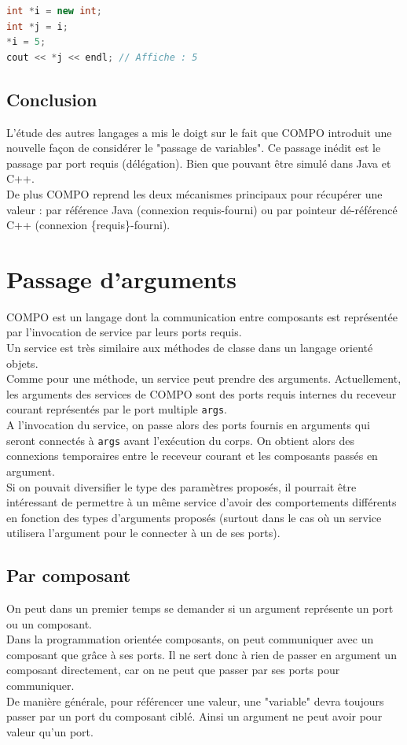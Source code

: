 \documentclass[11pt,a4paper,openany,oneside]{book}
\begin{document}
\begin{lstlisting}[language=C++, frame=single, caption=Exemple en c++]
int *i = new int;
int *j = i;
*i = 5;
cout << *j << endl; // Affiche : 5
\end{lstlisting}

\subsection{Conclusion}
L'étude des autres langages a mis le doigt sur le fait que COMPO introduit une nouvelle façon de considérer le "passage de variables". Ce passage inédit est le passage par port requis (délégation). Bien que pouvant être simulé dans Java et C++.\\
De plus COMPO reprend les deux mécanismes principaux pour récupérer une valeur : par référence Java (connexion requis-fourni) ou par pointeur dé-référencé C++ (connexion \{requis\}-fourni).

\newpage

\section{Passage d'arguments}

COMPO est un langage dont la communication entre composants est représentée par l'invocation de service par leurs ports requis.\\
Un service est très similaire aux méthodes de classe dans un langage orienté objets.\\
Comme pour une méthode, un service peut prendre des arguments.
Actuellement, les arguments des services de COMPO sont des ports requis internes du receveur courant représentés par le port multiple \texttt{args}.\\
A l'invocation du service, on passe alors des ports fournis en arguments qui seront connectés à \texttt{args} avant l'exécution du corps. On obtient alors des connexions temporaires entre le receveur courant et les composants passés en argument.\\ 
Si on pouvait diversifier le type des paramètres proposés, il pourrait être intéressant de permettre à un même service d'avoir des comportements différents en fonction des types d'arguments proposés (surtout dans le cas où un service utilisera l'argument pour le connecter à un de ses ports).


\subsection{Par composant}
On peut dans un premier temps se demander si un argument représente un port ou un composant.\\
Dans la programmation orientée composants, on peut communiquer avec un composant que grâce à ses ports. Il ne sert donc à rien de passer en argument un composant directement, car on ne peut que passer par ses ports pour communiquer.\\
De manière générale, pour référencer une valeur, une "variable" devra toujours passer par un port du composant ciblé. Ainsi un argument ne peut avoir pour valeur qu'un port.
\end{document}
